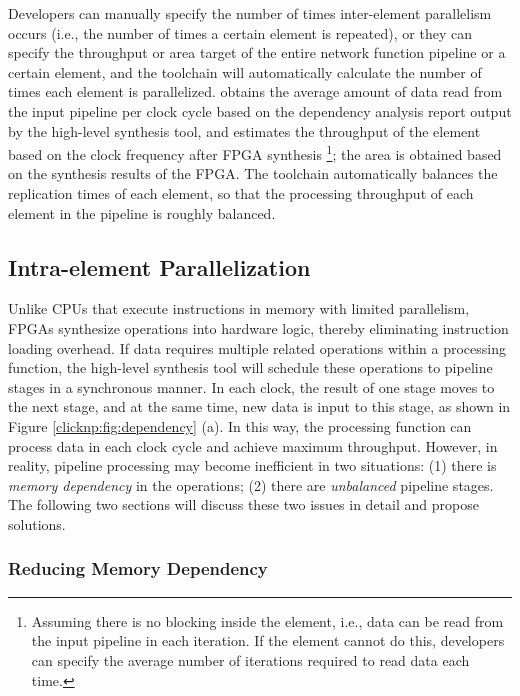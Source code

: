 Developers can manually specify the number of times inter-element parallelism occurs (i.e., the number of times a certain element is repeated), or they can specify the throughput or area target of the entire network function pipeline or a certain element, and the \name toolchain will automatically calculate the number of times each element is parallelized. \name obtains the average amount of data read from the input pipeline per clock cycle based on the dependency analysis report output by the high-level synthesis tool, and estimates the throughput of the element based on the clock frequency after FPGA synthesis \footnote{Assuming there is no blocking inside the element, i.e., data can be read from the input pipeline in each iteration. If the element cannot do this, developers can specify the average number of iterations required to read data each time.}; the area is obtained based on the synthesis results of the FPGA. The \name toolchain automatically balances the replication times of each element, so that the processing throughput of each element in the pipeline is roughly balanced.

\subsection{Intra-element Parallelization}
\label{clicknp:subsec:paral_in_elem}

Unlike CPUs that execute instructions in memory with limited parallelism, FPGAs synthesize operations into hardware logic, thereby eliminating instruction loading overhead.
If data requires multiple related operations within a processing function, the high-level synthesis tool will schedule these operations to pipeline stages in a synchronous manner.
In each clock, the result of one stage moves to the next stage, and at the same time, new data is input to this stage, as shown in Figure \ref{clicknp:fig:dependency} (a).
In this way, the processing function can process data in each clock cycle and achieve maximum throughput.
However, in reality, pipeline processing may become inefficient in two situations: (1) there is \textit{memory dependency} in the operations; (2) there are \textit{unbalanced} pipeline stages.
The following two sections will discuss these two issues in detail and propose solutions.

\subsubsection{Reducing Memory Dependency}

